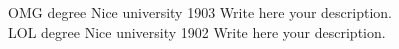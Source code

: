 \documentclass[11pt]{strongalecv}
\begin{document}
\begin{MainPart}
    \Experience
        {\ColorHighlight}
		{OMG degree}
		{Nice university}
        {1903}
        {   
            Write here your description.\\
            \lorem
        }
    \Experience
        {\ColorHighlight}
		{LOL degree}
		{Nice university}
        {1902}
        {   
            Write here your description.\\
            \lorem
        }



    \end{MainPart}

    
\end{document}

